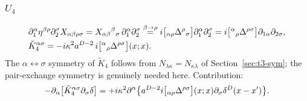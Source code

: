 \subsubsection{\texorpdfstring{$U_4$}{U4}}\label{sec:t3-U4}
\begin{equation}\label{eq:t3-K4}
\begin{aligned}
\relax&\partial_1^\alpha\eta^{\beta\rho}\partial_2^\sigma X_{\alpha\beta\rho\sigma}
=X_{\alpha\beta}{}^\beta{}_\sigma\,\partial_1^\alpha\partial_2^\sigma
\overset{\beta\to\rho}{=}i\bigl[{}_{\alpha\rho}\Delta^\rho{}_\sigma\bigr]\partial_1^\alpha\partial_2^\sigma
=i\bigl[{}^\alpha{}_\rho\Delta^{\rho\sigma}\bigr]\partial_{1\alpha}\partial_{2\sigma},\\
&\tilde K_4^{\alpha\sigma}=-i\kappa^2a^{D-2}\,i\bigl[{}^\alpha{}_\rho\Delta^{\rho\sigma}\bigr](x;x).
\end{aligned}
\end{equation}
The \(\alpha\leftrightarrow\sigma\) symmetry of \(\tilde K_4\) follows from
\(N_{\lambda\kappa}=N_{\kappa\lambda}\) of Section~\ref{sec:t3-sym}; the pair-exchange
symmetry is genuinely needed here. Contribution:
\begin{equation*}
-\partial_\alpha\bigl[\tilde K_4^{\alpha\sigma}\partial_\sigma\delta\bigr]
=+i\kappa^2\partial^\alpha\bigl\{a^{D-2}i\bigl[{}_{\alpha\rho}\Delta^{\rho\sigma}\bigr](x;x)\partial_\sigma\delta^D(x-x')\bigr\}.
\end{equation*}

